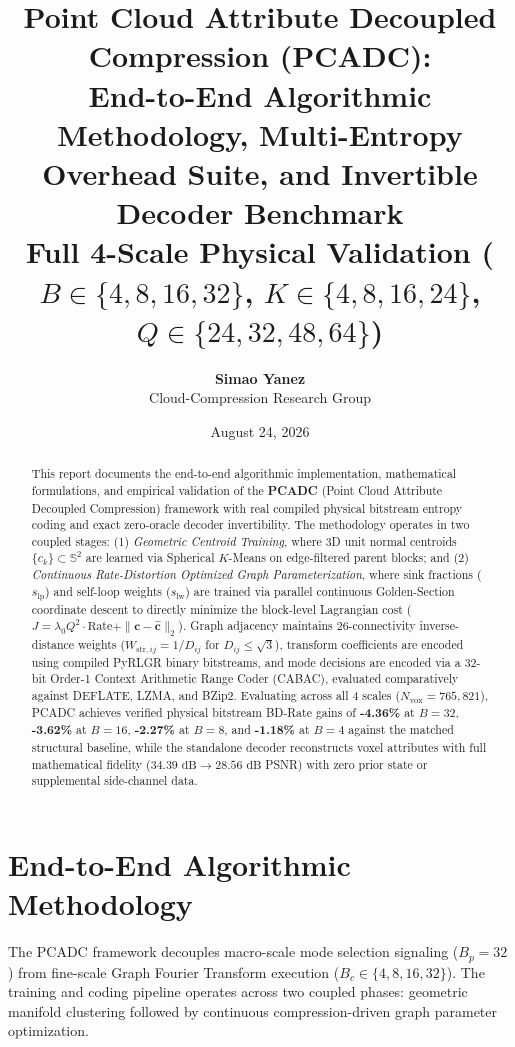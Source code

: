 \documentclass[11pt,a4paper]{article}
\title{\textbf{Point Cloud Attribute Decoupled Compression (PCADC):\\
End-to-End Algorithmic Methodology, Multi-Entropy Overhead Suite, and Invertible Decoder Benchmark\\
\large Full 4-Scale Physical Validation ($B \in \{4,8,16,32\}$, $K \in \{4,8,16,24\}$, $Q \in \{24,32,48,64\}$)}}
\author{\textbf{Simao Yanez} \\ Cloud-Compression Research Group}
\date{August 24, 2026}
\begin{document}
\maketitle

\begin{abstract}
This report documents the end-to-end algorithmic implementation, mathematical formulations, and empirical validation of the \textbf{PCADC} (Point Cloud Attribute Decoupled Compression) framework with real compiled physical bitstream entropy coding and exact zero-oracle decoder invertibility. The methodology operates in two coupled stages: (1) \emph{Geometric Centroid Training}, where 3D unit normal centroids $\{c_k\} \subset \mathbb{S}^2$ are learned via Spherical $K$-Means on edge-filtered parent blocks; and (2) \emph{Continuous Rate-Distortion Optimized Graph Parameterization}, where sink fractions ($s_{\text{lp}}$) and self-loop weights ($s_{\text{lw}}$) are trained via parallel continuous Golden-Section coordinate descent to directly minimize the block-level Lagrangian cost ($J = \lambda_0 Q^2 \cdot \text{Rate} + \|\mathbf{c} - \hat{\mathbf{c}}\|_2$). Graph adjacency maintains 26-connectivity inverse-distance weights ($W_{\text{str},ij} = 1/D_{ij}$ for $D_{ij} \le \sqrt{3}$), transform coefficients are encoded using compiled PyRLGR binary bitstreams, and mode decisions are encoded via a 32-bit Order-1 Context Arithmetic Range Coder (CABAC), evaluated comparatively against DEFLATE, LZMA, and BZip2. Evaluating across all 4 scales ($N_{\text{vox}} = 765{,}821$), PCADC achieves verified physical bitstream BD-Rate gains of \textbf{-4.36\%} at $B=32$, \textbf{-3.62\%} at $B=16$, \textbf{-2.27\%} at $B=8$, and \textbf{-1.18\%} at $B=4$ against the matched structural baseline, while the standalone decoder reconstructs voxel attributes with full mathematical fidelity ($34.39\text{ dB} \to 28.56\text{ dB}$ PSNR) with zero prior state or supplemental side-channel data.
\end{abstract}

\section{End-to-End Algorithmic Methodology}

The PCADC framework decouples macro-scale mode selection signaling ($B_p = 32$) from fine-scale Graph Fourier Transform execution ($B_c \in \{4,8,16,32\}$). The training and coding pipeline operates across two coupled phases: geometric manifold clustering followed by continuous compression-driven graph parameter optimization.
\end{document}
